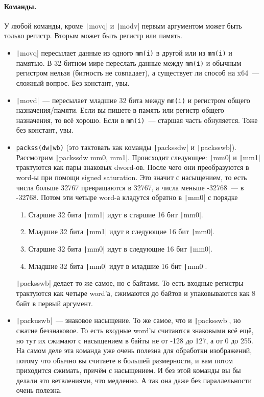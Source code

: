 \documentclass{article}
\begin{document}
    \paragraph{Команды.}
    У любой команды, кроме \texttt|movq| и \texttt|modv| первым аргументом может быть только регистр. Вторым может быть регистр или память.
    \begin{itemize}
        \item \texttt|movq| пересылает данные из одного \Verb|mm(i)| в другой или из \Verb|mm(i)| и памятью. В 32-битном мире переслать данные между \Verb|mm(i)| и обычным регистром нельзя (битность не совпадает), а существует ли способ на x64~--- сложный вопрос. Без констант, увы.
        \item \texttt|movd|~--- пересылает младшие 32 бита между \Verb|mm(i)| и регистром общего назначения/памяти. Если вы пишете в память или регистр общего назначения, то всё хорошо. Если в \Verb|mm(i)|~--- старшая часть обнуляется. Тоже без констант, увы.
        \item \Verb/packss(dw|wb)/ (это тактовать как команды \texttt|packssdw| и \texttt|packsswb|). Рассмотрим \texttt|packssdw mm0, mm1|. Происходит следующее: \texttt|mm0| и \texttt|mm1| трактуются как пары знаковых dword-ов. После чего они преобразуются в word-ы при помощи signed saturation. Это значит с насыщением, то есть числа больше 32767 превращаются в 32767, а числа меньше -32768~--- в -32768. Потом эти четыре word-а кладутся обратно в \texttt|mm0| с порядке
        \begin{enumerate}
            \item Старшие 32 бита \texttt|mm1| идут в старшие 16 бит \texttt|mm0|.
            \item Младшие 32 бита \texttt|mm1| идут в следующие 16 бит \texttt|mm0|.
            \item Старшие 32 бита \texttt|mm0| идут в следующие 16 бит \texttt|mm0|.
            \item Младшие 32 бита \texttt|mm0| идут в младшие 16 бит \texttt|mm0|.
        \end{enumerate}
        \texttt|packsswb| делает то же самое, но с байтами. То есть входные регистры трактуются как четыре word'а, сжимаются до байтов и упаковываются как 8 байт в первый аргумент.
        \item \texttt|packuswb|~--- знаковое насыщение. То же самое, что и \texttt|packsswb|, но сжатие беззнаковое. То есть входные word'ы считаются знаковыми всё ещё, но тут их сжимают с насыщением в байты не от -128 до 127, а от 0 до 255. На самом деле эта команда уже очень полезна для обработки изображений, потому что обычно вы считаете в большей размерности, и вам потом приходится сжимать, причём с насыщением. И без этой команды вы бы делали это ветвлениями, что медленно. А так она даже без параллельности очень полезна.

\end{itemize}
\end{document}
